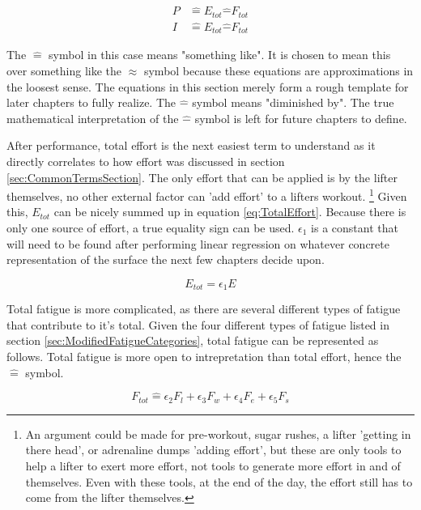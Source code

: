 \begin{equation}
	\label{eq:PerformanceProxy}
	\begin{split}
			P &\hat{=} E_{tot}\hat{-}F_{tot} \\
			I &\hat{=} E_{tot}\hat{-}F_{tot}
	\end{split}
\end{equation}

The $\hat{=}$ symbol in this case means "something like". It is chosen to mean this over something like the $\approx$ symbol because these equations are approximations in the loosest sense. The equations in this section merely form a rough template for later chapters to fully realize. The $\hat{-}$ symbol means "diminished by". The true mathematical interpretation of the $\hat{-}$ symbol is left for future chapters to define.

After performance, total effort is the next easiest term to understand as it directly correlates to how effort was discussed in section \ref{sec:CommonTermsSection}. The only effort that can be applied is by the lifter themselves, no other external factor can 'add effort' to a lifters workout. \footnote{An argument could be made for pre-workout, sugar rushes, a lifter 'getting in there head', or adrenaline dumps 'adding effort', but these are only tools to help a lifter to exert more effort, not tools to generate more effort in and of themselves. Even with these tools, at the end of the day, the effort still has to come from the lifter themselves.} Given this, $E_{tot}$ can be nicely summed up in equation \ref{eq:TotalEffort}. Because there is only one source of effort, a true equality sign can be used. $\epsilon_1$ is a constant that will need to be found after performing linear regression on whatever concrete representation of the surface the next few chapters decide upon.

\begin{equation}
	\label{eq:TotalEffort}
	E_{tot}=\epsilon_1 E
\end{equation}

Total fatigue is more complicated, as there are several different types of fatigue that contribute to it's total. Given the four different types of fatigue listed in section \ref{sec:ModifiedFatigueCategories}, total fatigue can be represented as follows. Total fatigue is more open to intrepretation than total effort, hence the $\hat{=}$ symbol.

\begin{equation*}
	F_{tot} \hat{=} \epsilon_2 F_l+\epsilon_3 F_w+\epsilon_4 F_e+\epsilon_5 F_s
\end{equation*}

